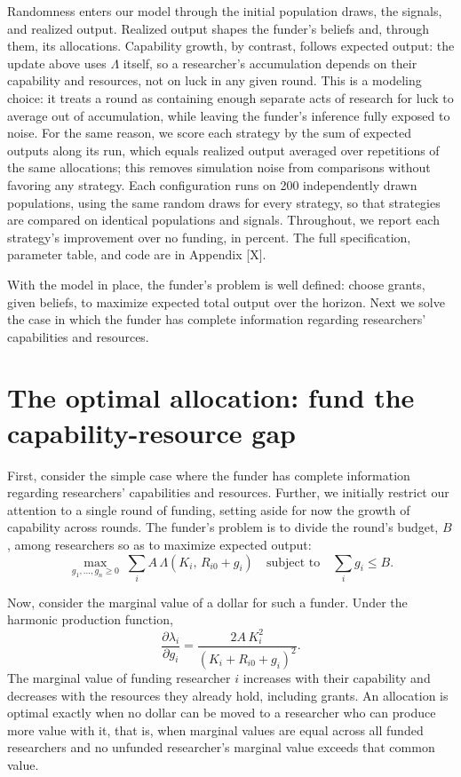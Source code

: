 \documentclass[article, 11pt, reqno]{amsart}
\theoremstyle{named}
\begin{document}
Randomness enters our model through the initial population draws, the signals, and realized output. Realized output shapes the funder's beliefs and, through them, its allocations. Capability growth, by contrast, follows expected output: the update above uses $\Lambda$ itself, so a researcher's accumulation depends on their capability and resources, not on luck in any given round. This is a modeling choice: it treats a round as containing enough separate acts of research for luck to average out of accumulation, while leaving the funder's inference fully exposed to noise. For the same reason, we score each strategy by the sum of expected outputs along its run, which equals realized output averaged over repetitions of the same allocations; this removes simulation noise from comparisons without favoring any strategy. Each configuration runs on 200 independently drawn populations, using the same random draws for every strategy, so that strategies are compared on identical populations and signals. Throughout, we report each strategy's improvement over no funding, in percent. The full specification, parameter table, and code are in Appendix [X]. %

With the model in place, the funder's problem is well defined: choose grants, given beliefs, to maximize expected total output over the horizon. Next we solve the case in which the funder has complete information regarding researchers' capabilities and resources.


\section{The optimal allocation: fund the capability-resource gap}\label{sec:optimal}

First, consider the simple case where the funder has complete information regarding researchers' capabilities and resources. Further, we initially restrict our attention to a single round of funding, setting aside for now the growth of capability across rounds. The funder's problem is to divide the round's budget, $B$, among researchers so as to maximize expected output:
\[
\max_{g_1, \ldots, g_n \geq 0} \; \sum_{i} A\,\Lambda(K_i,\, R_{i0} + g_i) \quad \text{subject to} \quad \sum_{i} g_i \leq B.
\]

Now, consider the marginal value of a dollar for such a funder. Under the harmonic production function,
\[
\frac{\partial \lambda_i}{\partial g_i} = \frac{2A\,K_i^2}{(K_i + R_{i0} + g_i)^2}.
\]
The marginal value of funding researcher $i$ increases with their capability and decreases with the resources they already hold, including grants. An allocation is optimal exactly when no dollar can be moved to a researcher who can produce more value with it, that is, when marginal values are equal across all funded researchers and no unfunded researcher's marginal value exceeds that common value.
\end{document}
